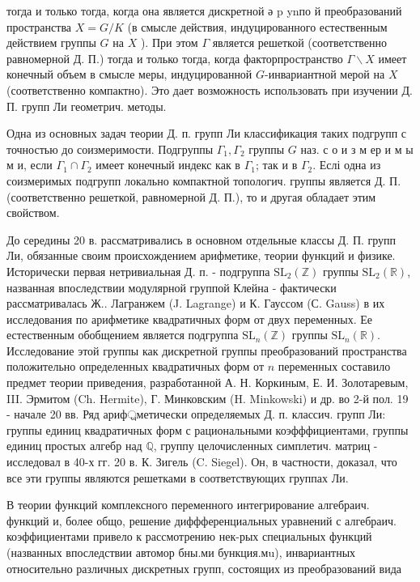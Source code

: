 \documentclass[10pt]{article}
\begin{document}
тогда и только тогда, когда она является дискретной ә p ynпо й преобразований пространства $X=G / K$ (в смысле действия, индуцированного естественным действием группы $G$ на $X$ ). При этом $\Gamma$ является решеткой (соответственно равномерной Д. П.) тогда и только тогда, когда факторпространство $\Gamma \backslash X$ имеет конечный объем в смысле меры, индуцированной $G$-инвариантной мерой на $X$ (соответственно компактно). Это дает возможность использовать при изучении Д. П. групп Ли геометрич. методы.



Одна из основных задач теории Д. п. групп Ли классификация таких подгрупп с точностью до соизмеримости. Подгруппы $\Gamma_{1}, \Gamma_{2}$ группы $G$ наз. с о и з м ер и м ы м и, если $\Gamma_{1} \cap \Gamma_{2}$ имеет конечный индекс как в $\Gamma_{1}$; так и в $\Gamma_{2}$. Еслі одна из соизмеримых подгрупп локально компактной топологич. группы является Д. П. (соответственно решеткой, равномерной Д. П.), то и другая обладает этим свойством.



До середины 20 в. рассматривались в основном отдельные классы Д. П. групп Ли, обязанные своим происхождением арифметике, теории функций и физике. Исторически первая нетривиальная Д. п. - подгруппа $\mathrm{SL}_{2}(\mathbb{Z})$ группы $\mathrm{SL}_{2}(\mathbb{R})$, названная впоследствии модулярной группой Клейна - фактически рассматривалась Ж.. Лагранжем (J. Lagrange) и К. Гауссом (С. Gauss) в их исследования по арифметике квадратичных форм от двух переменных. Ее естественным обобщением является подгруппа $\mathrm{SL}_{n}(\mathbb{Z})$ группы $\mathrm{SL}_{n}(\mathbb{R})$. Исследование этой группы как дискретной группы преобразований пространства положительно определенных квадратичных форм от $n$ переменных составило предмет теории приведения, разработанной А. Н. Коркиным, Е. И. Золотаревым, III. Эрмитом (Ch. Hermite), Г. Минковским (H. Minkowski) и др. во 2-й пол. 19 - начале 20 вв. Ряд ариф্রметически определяемых Д. п. классич. групп Ли: группы единиц квадратичных форм с рациональными коэфффициентами, группы единиц простых алгебр над $\mathbb{Q}$, группу целочисленных симплетич. матриц - исследовал в 40-х гг. 20 в. К. Зигель (C. Siegel). Он, в частности, доказал, что все эти группы являются решетками в соответствующих группах Ли.



В теории функций комплексного переменного интегрирование алгебраич. функций и, более общо, решение диффференциальных уравнений с алгебраич. коэффициентами привело к рассмотрению нек-рых специальных функций (названных впоследствии автомор бны.ми бункция.мu), инвариантных относительно различных дискретных групп, состоящих из преобразований вида
\end{document}
